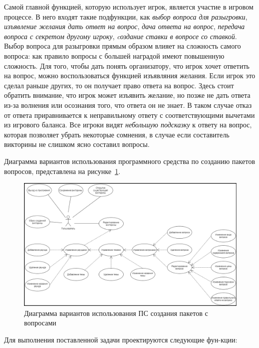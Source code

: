 Самой главной функцией, которую использует игрок, является участие в игровом процессе. В него входят такие подфункции, как \emph{выбор вопроса для разыгровки},
\emph{изъявление желания дать ответ на вопрос}, \emph{дача ответа на вопрос}, \emph{передача вопроса с секретом другому игроку}, \emph{cоздание ставки в вопросе со ставкой}.
Выбор вопроса для разыгровки прямым образом влияет на сложность самого вопроса: как правило вопросы с большей наградой имеют повышенную сложность. Для того, чтобы дать понять
организатору, что игрок хочет ответить на вопрос, можно воспользоваться функцией изъявляния желания. Если игрок это сделал раньше других, то он получает право ответа на вопрос.
Здесь стоит обратить внимание, что игрок может изъявить желание, но позже не дать ответа из-за волнения или осознания того, что ответа он не знает. В таком случае отказ от ответа 
приравнивается к неправильному ответу с соответствующими вычетами из игрового баланса. Все игроки видят \emph{небольшую подсказку} к ответу на вопрос, которая позволяет убрать некоторые 
сомнения, в случае если составитель викторины не слишком ясно составил вопросы.

Диаграмма вариантов использования программного средства по созданию пакетов вопросов, представлена на рисунке~\ref{fig:domain:model:use_cases:model_test}.

\begin{figure}
\centering
	\includegraphics[scale=0.75]{attachments/use_case_model_test.png}
	\caption{Диаграмма вариантов использования ПС создания пакетов с вопросами}
	\label{fig:domain:model:use_cases:model_test}
\end{figure}

\clearpage

Для выполнения поставленной задачи проектируются следующие фун-кции:

